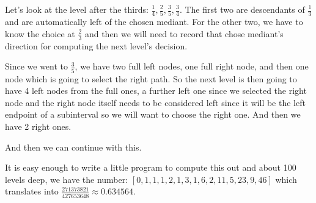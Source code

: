 \documentclass[12pt]{article}
\theoremstyle{remark}
\begin{document}
Let's look at the level after the thirds:  $\frac{1}{4}, \frac{2}{5}, \frac{3}{5}, \frac{3}{4}$. The first two are descendants of $\frac{1}{3}$ and are automatically left of the chosen mediant. For the other two, we have to know the choice at $\frac{2}{3}$ and then we will need to record that chose mediant's direction for computing the next level's decision. 

Since we went to $\frac{3}{5}$, we have two full left nodes, one full right node, and then one node which is going to select the right path. So the next level is then going to have 4 left nodes from the full ones, a further left one since we selected the right node and the right node itself needs to be considered left since it will be the left endpoint of a subinterval so we will want to choose the right one. And then we have 2 right ones. 

And then we can continue with this. 

It is easy enough to write a little program to compute this out and about 100 levels deep, we have the number:  $[
       0,      1,      1,      1,       2,
       1,      3,      1,      6,       2,
      11,      5,     23,      9,      46]$  which translates into $\frac{271373821}{427653648} \approx 0.634564$. 


\medskip

\printbibliography
\end{document}
